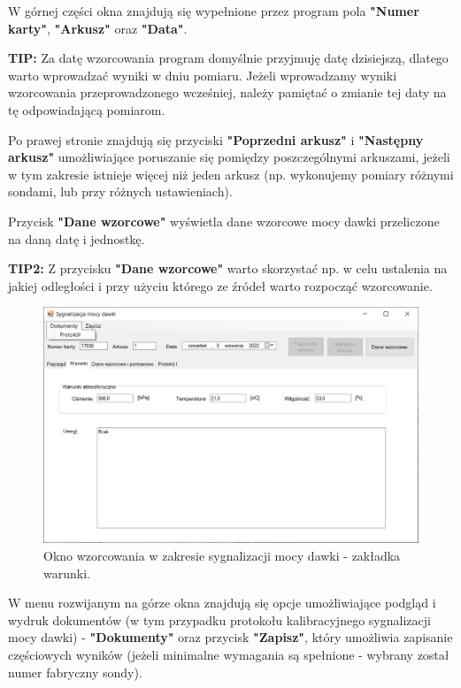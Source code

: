 	W górnej części okna znajdują się wypełnione przez program pola \textbf{"Numer karty"}, \textbf{"Arkusz"} oraz \textbf{"Data"}. 
	
	\textbf{TIP:} Za datę wzorcowania program domyślnie przyjmuję datę dzisiejszą, dlatego warto wprowadzać wyniki w dniu pomiaru. Jeżeli wprowadzamy wyniki wzorcowania przeprowadzonego wcześniej, należy pamiętać o zmianie tej daty na tę odpowiadającą pomiarom.
	
	Po prawej stronie znajdują się przyciski \textbf{"Poprzedni arkusz"} i \textbf{"Następny arkusz"} umożliwiające poruszanie się pomiędzy poszczególnymi arkuszami, jeżeli w tym zakresie istnieje więcej niż jeden arkusz (np. wykonujemy pomiary różnymi sondami, lub przy różnych ustawieniach).
	
	Przycisk \textbf{"Dane wzorcowe"} wyświetla dane wzorcowe mocy dawki przeliczone na daną datę i jednostkę.
	
	\textbf{TIP2:} Z przycisku \textbf{"Dane wzorcowe"} warto skorzystać np. w celu ustalenia na jakiej odległości i przy użyciu którego ze źródeł warto rozpocząć wzorcowanie.
	
	\begin{figure}[htb]
	\centering
	\includegraphics[width=\columnwidth]{obrazki/Wzorcowanie/syg_mocy_dawki/warunki.png}
	\caption{Okno wzorcowania w zakresie sygnalizacji mocy dawki - zakładka warunki.}
	\label{sygMocyWarunki}
	\end{figure}
	
	W menu rozwijanym na górze okna znajdują się opcje umożliwiające podgląd i wydruk dokumentów (w tym przypadku protokołu kalibracyjnego sygnalizacji mocy dawki) - \textbf{"Dokumenty"} oraz przycisk \textbf{"Zapisz"}, który umożliwia zapisanie częściowych wyników (jeżeli minimalne wymagania są spełnione - wybrany został numer fabryczny sondy).
	
